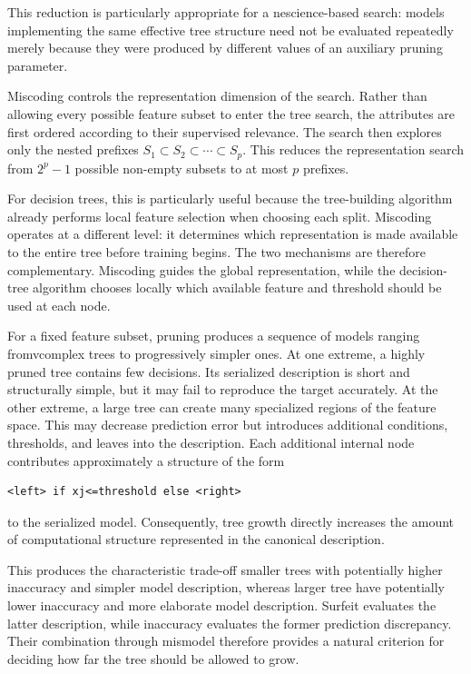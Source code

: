 This reduction is particularly appropriate for a nescience-based search: models implementing the same effective tree structure need not be evaluated repeatedly merely because they were produced by different values of an auxiliary pruning parameter.

Miscoding controls the representation dimension of the search. Rather than allowing every possible feature subset to enter the tree search, the attributes are first ordered according to their supervised relevance. The search then explores only the nested prefixes $S_1\subset S_2\subset\cdots\subset S_p$. This reduces the representation search from $2^p-1$ possible non-empty subsets to at most $p$ prefixes.

For decision trees, this is particularly useful because the tree-building algorithm already performs local feature selection when choosing each split. Miscoding operates at a different level: it determines which representation is made available to the entire tree before training begins. The two mechanisms are therefore complementary. Miscoding guides the global representation, while the decision-tree algorithm chooses locally which available feature and threshold should be used at each node.

For a fixed feature subset, pruning produces a sequence of models ranging fromvcomplex trees to progressively simpler ones. At one extreme, a highly pruned tree contains few decisions. Its serialized description is short and structurally simple, but it may fail to reproduce the target accurately. At the other extreme, a large tree can create many specialized regions of the feature space. This may decrease prediction error but introduces additional conditions, thresholds, and leaves into the description. Each additional internal node contributes approximately a structure of the form
\begin{verbatim}
<left> if xj<=threshold else <right>
\end{verbatim}
to the serialized model. Consequently, tree growth directly increases the amount of computational structure represented in the canonical description.

This produces the characteristic trade-off smaller trees with potentially higher inaccuracy and simpler model description, whereas larger tree have potentially lower inaccuracy and more elaborate model description. Surfeit evaluates the latter description, while inaccuracy evaluates the former prediction discrepancy. Their combination through mismodel therefore provides a natural criterion for deciding how far the tree should be allowed to grow.


